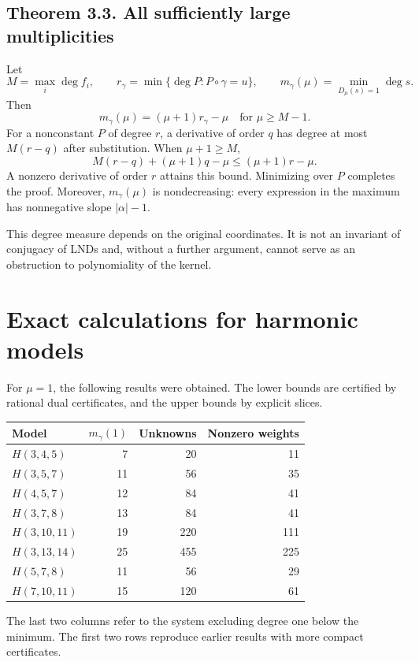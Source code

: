 \subsection*{Theorem 3.3. All sufficiently large multiplicities}
Let
\[
M=\max_i\deg f_i,\qquad
r_\gamma=\min\{\deg P:P\circ\gamma=u\},\qquad
m_\gamma(\mu)=\min_{D_\mu(s)=1}\deg s.
\]
Then
\[
\boxed{m_\gamma(\mu)=(\mu+1)r_\gamma-\mu\quad\text{for }\mu\ge M-1.}
\]
For a nonconstant $P$ of degree $r$, a derivative of order $q$ has degree at most $M(r-q)$ after substitution. When $\mu+1\ge M$,
\[
M(r-q)+(\mu+1)q-\mu\le(\mu+1)r-\mu.
\]
A nonzero derivative of order $r$ attains this bound. Minimizing over $P$ completes the proof. Moreover, $m_\gamma(\mu)$ is nondecreasing: every expression in the maximum has nonnegative slope $|\alpha|-1$.

This degree measure depends on the original coordinates. It is not an invariant of conjugacy of LNDs and, without a further argument, cannot serve as an obstruction to polynomiality of the kernel.

\section{Exact calculations for harmonic models}\label{sec:computed}
For $\mu=1$, the following results were obtained. The lower bounds are certified by rational dual certificates, and the upper bounds by explicit slices.

\begin{center}\small\renewcommand{\arraystretch}{1.22}
\begin{tabular}{@{}lrrr@{}}\toprule
Model & $m_\gamma(1)$ & Unknowns & Nonzero weights\\\midrule
$H(3,4,5)$ &7&20&11\\
$H(3,5,7)$ &11&56&35\\
$H(4,5,7)$ &12&84&41\\
$H(3,7,8)$ &13&84&41\\
$H(3,10,11)$ &19&220&111\\
$H(3,13,14)$ &25&455&225\\
$H(5,7,8)$ &11&56&29\\
$H(7,10,11)$ &15&120&61\\\bottomrule
\end{tabular}\end{center}
The last two columns refer to the system excluding degree one below the minimum. The first two rows reproduce earlier results with more compact certificates.

